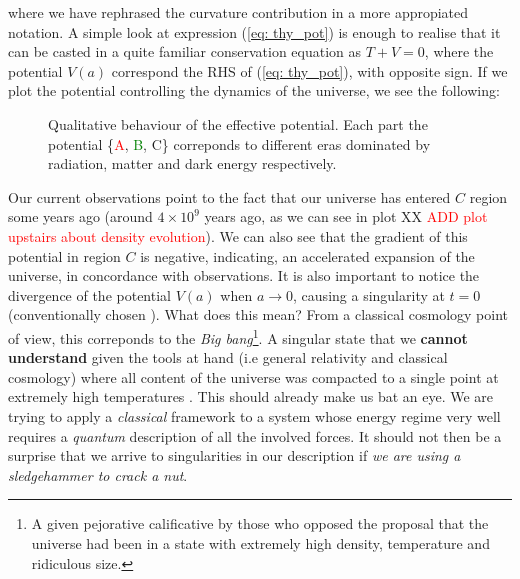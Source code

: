 \documentclass[11pt, a4paper]{article} %
\begin{document}
where we have rephrased the curvature contribution in a more appropiated notation. A simple look at expression (\ref{eq: thy_pot}) is enough to realise that it can be casted in a quite familiar conservation equation as $T + V = 0$, where the potential $V(a)$ correspond the RHS of (\ref{eq: thy_pot}), with opposite sign. If we plot the potential controlling the dynamics of the universe, we see the following:

\vspace{0.5cm} %
\begin{figure}[h]
    \centering
    
	\caption{Qualitative behaviour of the effective potential. Each part the potential \{\textcolor{red}{A}, \textcolor{green}{B}, C\} correponds to different eras dominated by radiation, matter and dark energy respectively.}
	\label{Fig: classical_cosmo_pot}
\end{figure}

Our current observations point to the fact that our universe has entered $C$ region some years ago (around $4\times 10^{9}$ years ago, as we can see in plot XX \textcolor{red}{ADD plot upstairs about density evolution}). We can also see that the gradient of this potential in region $C$ is negative, indicating, an accelerated expansion of the universe, in concordance with observations. It is also important to notice the divergence of the potential $V(a)$ when $a \rightarrow 0$, causing a singularity at $t=0$ (conventionally chosen \cite{hawking1970singularities}). What does this mean? From a classical cosmology point of view, this correponds to the \textit{Big bang}\footnote{A given pejorative calificative by those who opposed the proposal that the universe had been in a state with extremely high density, temperature and ridiculous size.}. A singular state that we \textbf{cannot understand} given the tools at hand (i.e general relativity and classical cosmology) where all content of the universe was compacted to a single point at extremely high temperatures \cite{lemaitre1950primeval}. This should already make us bat an eye. We are trying to apply a \textit{classical} framework to a system whose energy regime very well requires a \textit{quantum} description of all the involved forces. It should not then be a surprise that we arrive to singularities in our description if \textit{we are using a sledgehammer to crack a nut}.
\end{document}
